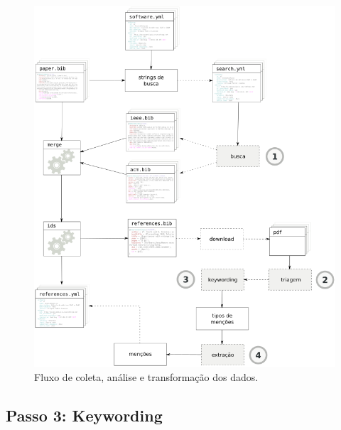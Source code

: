 \begin{figure}[h]
  \center
  \includegraphics[scale=0.35]{imagens/estudo2-fluxograma.png}
  \caption{Fluxo de coleta, análise e transformação dos dados.}
  \label{estudo2-fluxograma}
\end{figure}


%

\subsection{Passo 3: Keywording}

